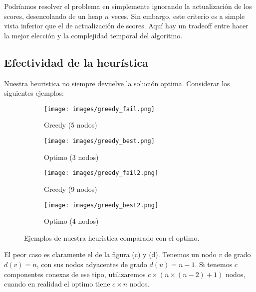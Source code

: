 Podríamos resolver el problema en  simplemente ignorando la actualización de los scores, desencolando de un heap $n$ veces. Sin embargo, este criterio es a simple vista inferior que el de actualización de scores. Aquí hay un tradeoff entre hacer la mejor elección y la complejidad temporal del algoritmo.

\subsection{Efectividad de la heurística}

Nuestra heuristica no siempre devuelve la solución optima. Considerar los siguientes ejemplos:

\begin{figure}[ht]
\centering
\begin{subfigure}[b]{0.4\textwidth}
	\texttt{[image: images/greedy\_fail.png]}
	\caption{Greedy (5 nodos)}
\end{subfigure}
\begin{subfigure}[b]{0.4\textwidth}
	\texttt{[image: images/greedy\_best.png]}
	\caption{Optimo (3 nodos)}
\end{subfigure}

\begin{subfigure}[b]{0.4\textwidth}
	\texttt{[image: images/greedy\_fail2.png]}
	\caption{Greedy (9 nodos)}
\end{subfigure}
\begin{subfigure}[b]{0.4\textwidth}
	\texttt{[image: images/greedy\_best2.png]}
	\caption{Optimo (4 nodos)}
\end{subfigure}
\caption{Ejemplos de nuestra heuristica comparado con el optimo.}
\end{figure}

El peor caso es claramente el de la figura (c) y (d). Tenemos un nodo $v$ de grado $d(v) = n$, con sus nodos adyacentes de grado $d(u) = n - 1$. Si tenemos $c$ componentes conexas de ese tipo, utilizaremos $c \times (n \times (n-2) + 1)$ nodos, cuando en realidad el optimo tiene $c \times n$ nodos.



